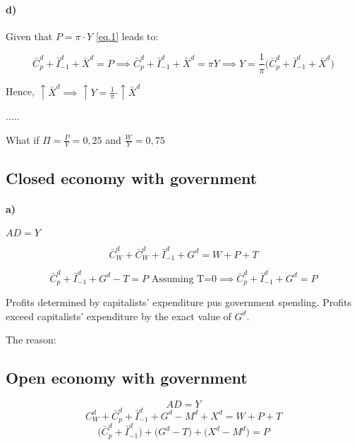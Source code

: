 \documentclass{report}
\begin{document}

\paragraph{d)} Given that $P=\pi \cdot Y$ \ref{eq.1} leads to:

\begin{equation*}
    \bar{C}^d_p+\bar{I}^d_{-1}+\bar{X}^d=P \implies \bar{C}^d_p+\bar{I}^d_{-1}+\bar{X}^d=\pi Y \implies Y=\frac{1}{\pi}\big(\bar{C}^d_p+\bar{I}^d_{-1}+\bar{X}^d\big)
\end{equation*}

Hence, $\uparrow \bar{X}^d \implies \uparrow Y=\frac{1}{\pi}\cdot \uparrow \bar{X}^d$

.....



What if $\Pi = \frac{P}{Y} = 0,25$ and $\frac{W}{Y} = 0,75$

\subsection{Closed economy with government}

\paragraph{a)} $AD=Y$

\begin{equation*}
    \bar{C}^d_W+\bar{C}^d_W+\bar{I}^d_{-1}+G^d=W+P+T 
\end{equation*}

\begin{equation}
    \bar{C}^d_p+\bar{I}^d_{-1}+G^d-T=P \text{ Assuming T=0} \implies \bar{C}^d_p+\bar{I}^d_{-1}+G^d=P
\end{equation} 

Profits determined by capitalists' expenditure pus government spending. Profits exceed capitalists' expenditure by the exact value of $G^d$. 

The reason: 


\subsection{Open economy with government}
\begin{equation*}
    AD=Y
\end{equation*}
\begin{equation*}
    C^d_W+\bar{C}^d_p+\bar{I}^d_{-1}+G^d-M^d+X^d=W+P+T
\end{equation*}
\begin{equation}
    \big(\bar{C}^d_p+\bar{I}^d_{-1} \big)+\big(G^d-T \big)+ \big(X^d-M^d \big)=P
\end{equation}
\end{document}
